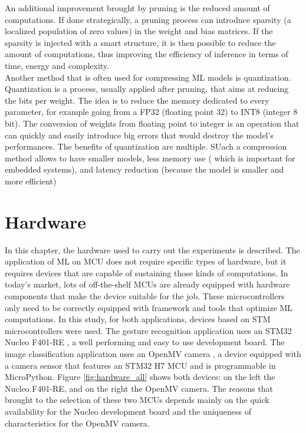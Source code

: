 \documentclass[12pt]{report}
\begin{document}
An additional improvement brought by pruning is the reduced amount of computations. If done strategically, a pruning process can introduce sparsity (a localized population of zero values) in the weight and bias matrices. If the sparsity is injected with a smart structure, it is then possible to reduce the amount of computations, thus improving the efficiency of inference in terms of time, energy and complexity.\\

Another method that is often used for compressing ML models is quantization. Quantization is a process, usually applied after pruning, that aims at reducing the bits per weight. The idea is to reduce the memory dedicated to every parameter, for example going from a FP32 (floating point 32) to INT8 (integer 8 bit). The conversion of weights from floating point to integer is an operation that can quickly and easily introduce big errors that would destroy the model's performances. The benefits of quantization are multiple. SUach a compression method allows to have smaller models, less memory use ( which is important for embedded systems), and latency reduction (because the model is smaller and more efficient)



\chapter{Hardware} 
\label{hardware}
In this chapter, the hardware used to carry out the experiments is described. The application of ML on MCU does not require specific types of hardware, but it requires devices that are capable of sustaining those kinds of computations. In today's market, lots of off-the-shelf MCUs are already equipped with hardware components that make the device suitable for the job. These microcontrollers only need to be correctly equipped with framework and tools that optimize ML computations. In this study, for both applications, devices based on STM microcontrollers were used. The gesture recognition application uses an STM32 Nucleo F401-RE \autocite{nucleo_datasheet}, a well performing and easy to use development board. The image classification application uses an OpenMV camera \autocite{openmv_datasheet}, a device equipped with a camera sensor that features an STM32 H7 MCU and is programmable in MicroPython. Figure \ref{fig:hardware_all} shows both devices: on the left the Nucleo F401-RE, and on the right the OpenMV camera. The reasons that brought to the selection of these two MCUs depends mainly on the quick availability for the Nucleo development board and the uniqueness of characteristics for the OpenMV camera.
\end{document}
